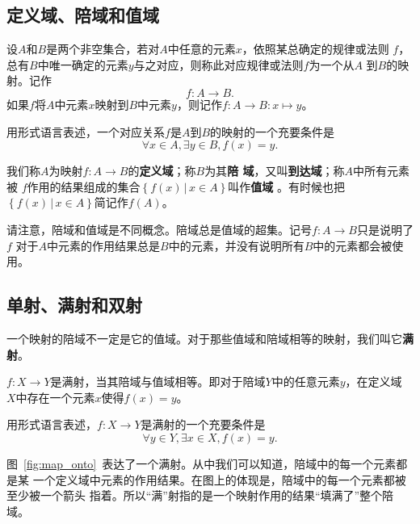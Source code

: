 \subsection{定义域、陪域和值域}

\begin{rawdef}[映射]
    设$A$和$B$是两个非空集合，若对$A$中任意的元素$x$，依照某总确定的规律或法则
    $f$，总有$B$中唯一确定的元素$y$与之对应，则称此对应规律或法则$f$为一个从$A$
    到$B$的映射。记作
    \[
        f: A \to B.
    \]
    如果$f$将$A$中元素$x$映射到$B$中元素$y$，则记作$f: A\to B: x\mapsto y$。

    用形式语言表述，一个对应关系$f$是$A$到$B$的映射的一个充要条件是
    \[
        \forall x \in A, \exists y \in B, f(x)=y.
    \]
\end{rawdef}

我们称$A$为映射$f: A \to B$的\textbf{定义域}；称$B$为其\textbf{陪
域}，又叫\textbf{到达域}；称$A$中所有元素被
$f$作用的结果组成的集合$\left\{ f(x) \,|\, x\in A \right\} $叫作\textbf{值域}
。有时候也把$\left\{ f(x) \,|\, x\in A \right\} $简记作$f(A)$。

请注意，陪域和值域是不同概念。陪域总是值域的超集。记号$f: A \to B$只是说明了$f$
对于$A$中元素的作用结果总是$B$中的元素，并没有说明所有$B$中的元素都会被使用。

\subsection{单射、满射和双射}

一个映射的陪域不一定是它的值域。对于那些值域和陪域相等的映射，我们叫它\textbf{满
射}。

\begin{rawdef}[满射]
    $f:X\to Y$是满射，当其陪域与值域相等。即对于陪域$Y$中的任意元素$y$，在定义域
    $X$中存在一个元素$x$使得$f(x)=y$。

    用形式语言表述，$f:X\to Y$是满射的一个充要条件是
    \[
        \forall y \in Y, \exists x \in X, f(x)=y.
    \]
\end{rawdef}

图~\ref{fig:map_onto}~表达了一个满射。从中我们可以知道，陪域中的每一个元素都是某
一个定义域中元素的作用结果。在图上的体现是，陪域中的每一个元素都被至少被一个箭头
指着。所以“满”射指的是一个映射作用的结果“填满了”整个陪域。

